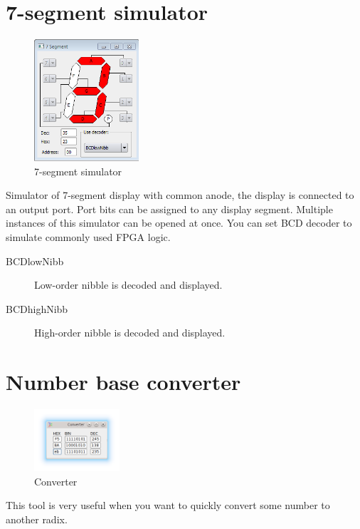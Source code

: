 \section{7-segment simulator}
    \begin{figure}
        \centering{}
        \includegraphics[width=110pt]{img/7seg_sim.png}
        \caption{7-segment simulator}
    \end{figure}
    Simulator of 7-segment display with common anode, the display is connected to an output port. Port bits can be
    assigned to any display segment. Multiple instances of this simulator can be opened at once. You can set BCD decoder
    to simulate commonly used FPGA logic.

    \begin{description}
        \item[BCDlowNibb] Low-order nibble is decoded and displayed.
        \item[BCDhighNibb] High-order nibble is decoded and displayed.
    \end{description}

\section{Number base converter}
    \begin{figure}
            \centering
            \includegraphics[width=90pt]{img/converter.png}
            \caption{Converter}
    \end{figure}

    This tool is very useful when you want to quickly convert some number to another radix.

